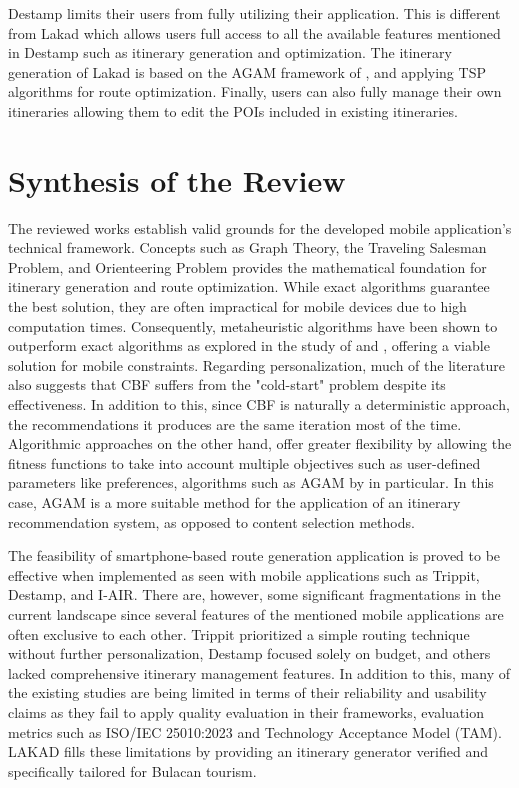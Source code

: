Destamp limits their users from fully utilizing their application. This is different from Lakad which allows users full access to all the available features mentioned in Destamp such as itinerary generation and optimization. The itinerary generation of Lakad is based on the AGAM framework of \textcite{Yochum2020}, and applying TSP algorithms for route optimization. Finally, users can also fully manage their own itineraries allowing them to edit the POIs included in existing itineraries.

\section{Synthesis of the Review}

The reviewed works establish valid grounds for the developed mobile application’s technical framework. Concepts such as Graph Theory, the Traveling Salesman Problem, and Orienteering Problem provides the mathematical foundation for itinerary generation and route optimization. While exact algorithms guarantee the best solution, they are often impractical for mobile devices due to high computation times. Consequently, metaheuristic algorithms have been shown to outperform exact algorithms as explored in the study of \textcite{Hossain2024} and \textcite{Wadi2025}, offering a viable solution for mobile constraints. Regarding personalization, much of the literature also suggests that CBF suffers from the "cold-start" problem despite its effectiveness. In addition to this, since CBF is naturally a deterministic approach, the recommendations it produces are the same iteration most of the time. Algorithmic approaches on the other hand, offer greater flexibility by allowing the fitness functions to take into account multiple objectives such as user-defined parameters like preferences, algorithms such as AGAM by \textcite{Yochum2020} in particular. In this case, AGAM is a more suitable method for the application of an itinerary recommendation system, as opposed to content selection methods.

The feasibility of smartphone-based route generation application is proved to be effective when  implemented as seen with mobile applications such as Trippit, Destamp, and I-AIR. There are, however, some significant fragmentations in the current landscape since several features of the mentioned mobile applications are often exclusive to each other. Trippit prioritized a simple routing technique without further personalization, Destamp focused solely on budget, and others lacked comprehensive itinerary management features. In addition to this, many of the existing studies are being limited in terms of their reliability and usability claims as they fail to apply quality evaluation in their frameworks, evaluation metrics such as ISO/IEC 25010:2023 and Technology Acceptance Model (TAM). LAKAD fills these limitations by providing an itinerary generator verified and specifically tailored for Bulacan tourism.

